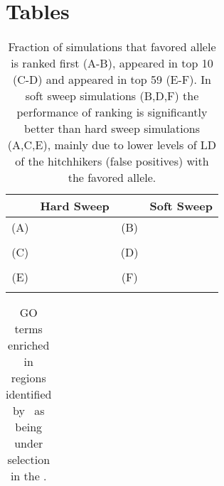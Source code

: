 \section*{Tables}

\begin{table}[H]
	\begin{tabular}{cc|cc}
		& Hard Sweep&  & Soft Sweep\\
		\hline
		(A) & & (B) & \\
		& {}
		& &{ }\\
		\hline
		(C) & & (D) & \\
		& {}
		& &{ }\\
		\hline
		(E) & & (F) & \\
		& {}
		& &{ }\\
		\hline
	\end{tabular}
	\caption{Fraction of simulations that favored allele is ranked first (A-B), 
	appeared in top 10 (C-D) and appeared in top 59 (E-F). In soft sweep 
	simulations (B,D,F) the performance of ranking is significantly better than 
	hard sweep simulations (A,C,E), mainly due to lower levels of LD of the 
	hitchhikers (false positives) with the favored allele.}\label{tab:rank}
\end{table}

\begin{table}[H]
	\begin{tabular}{c}
		
	\end{tabular}
	\caption{GO terms enriched in regions identified by \comale\ as being under 
	selection in the \data.}\label{tab:Fisher}
\end{table}

